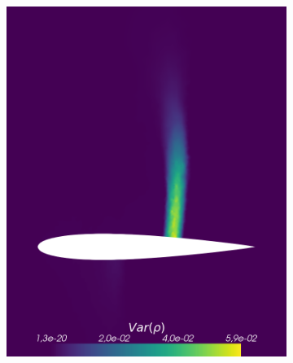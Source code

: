 \begin{figure}[h!]
\begin{subfigure}{0.329\linewidth}
		\includegraphics[width=\linewidth]{figs/Euler1DPlots10/euler2D_nacaCoarse_refadosipm_n2-9_sg2-4_s05_aoa_oneRet_VarRho.png}
		\label{fig:sub2}
	\end{subfigure}%
	\hfill
	\begin{subfigure}{0.329\linewidth}
		\centering

\end{subfigure}
\end{figure}
